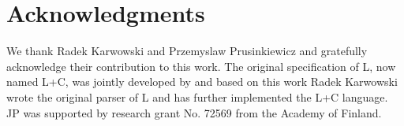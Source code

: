 \section{Acknowledgments}

We thank  Radek Karwowski and Przemyslaw  Prusinkiewicz and gratefully
acknowledge   their   contribution  to   this   work.   The   original
specification  of   L,  now  named  L+C,  was   jointly  developed  by
\citet{pp:99}  and  based  on  this  work Radek  Karwowski  wrote  the
original parser of L and  has further implemented the L+C language. JP
was supported by research grant No. 72569 from the Academy of Finland.
 